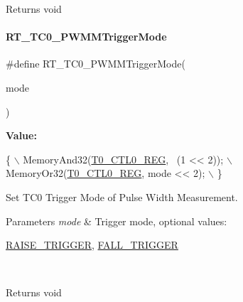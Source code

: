 \begin{DoxyReturn}{Returns}
void 
\end{DoxyReturn}
\mbox{\label{a00077_a48f8c6b4e5fba0057564f92060449557}} 
\paragraph{\texorpdfstring{R\+T\+\_\+\+T\+C0\+\_\+\+P\+W\+M\+M\+Trigger\+Mode}{RT\_TC0\_PWMMTriggerMode}}
{\footnotesize\ttfamily \#define R\+T\+\_\+\+T\+C0\+\_\+\+P\+W\+M\+M\+Trigger\+Mode(\begin{DoxyParamCaption}\item[{}]{mode }\end{DoxyParamCaption})}

{\bfseries Value\+:}
\begin{DoxyCode}
\{                                        \(\backslash\)
        MemoryAnd32(\mbox{\hyperlink{a00026_ac94b0659ef32086a6752672082c0b3ed}{T0\_CTL0\_REG}}, ~(1 << 2)); \(\backslash\)
        MemoryOr32(\mbox{\hyperlink{a00026_ac94b0659ef32086a6752672082c0b3ed}{T0\_CTL0\_REG}}, mode << 2);  \(\backslash\)
    \}
\end{DoxyCode}


Set T\+C0 Trigger Mode of Pulse Width Measurement. 


\begin{DoxyParams}{Parameters}
{\em mode} & Trigger mode, optional values\+:
\begin{DoxyCode}
\mbox{\hyperlink{a00026_abda90eda34a640b130f48a6ade23fe22}{RAISE\_TRIGGER}}, \mbox{\hyperlink{a00026_a9bbaf5b9e2125c7597249c7113b20e6c}{FALL\_TRIGGER}}
\end{DoxyCode}
 \\
\hline
\end{DoxyParams}
\begin{DoxyReturn}{Returns}
void 
\end{DoxyReturn}
\mbox{\label{a00077_a043d535ff9aad665ddf1521169a0f187}} 

